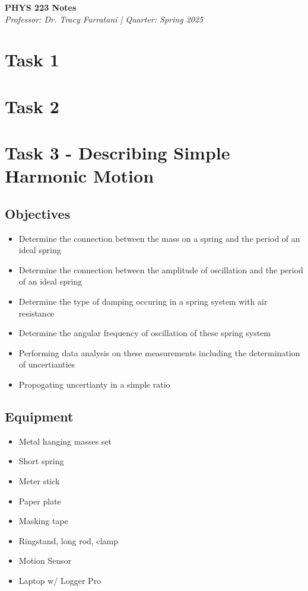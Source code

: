 \documentclass[12pt]{article}
\begin{document}
\begin{center}
    {\LARGE \textbf{PHYS 223 Notes}} \\
    \vspace{0.5em}
    {\large \textit{Professor: Dr. Tracy Furratani \quad | \quad Quarter: Spring 2025}} \\
    \vspace{0.5em}
\end{center}

\tableofcontents
\newpage


\section{Task 1}

\section{Task 2}

\section{Task 3 - Describing Simple Harmonic Motion}
\subsection{Objectives}
\begin{itemize}
\item Determine the connection between the mass on a spring and the period of an ideal spring
\item Determine the connection between the amplitude of oscillation and the period of an ideal spring
\item Determine the type of damping occuring in a spring system with air resistance
\item Determine the angular frequency of oscillation of these spring system
\item Performing data analysis on these measurements including the determination of uncertianties
\item Propogating uncertianty in a simple ratio
\end{itemize}
\subsection{Equipment}
\begin{itemize}
    \item Metal hanging masses set
    \item Short spring
    \item Meter stick
    \item Paper plate
    \item Masking tape
    \item Ringstand, long rod, clamp
    \item Motion Sensor
    \item Laptop w/ Logger Pro
\end{itemize}
\end{document}
